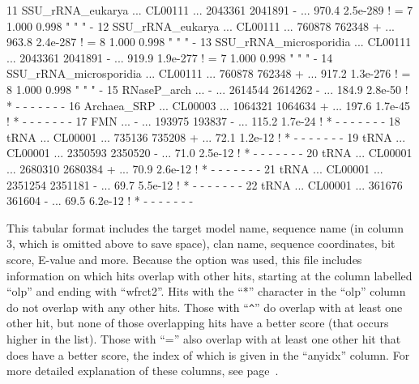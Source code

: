 \begin{tinysreoutput}
11   SSU_rRNA_eukarya       ... CL00111   ... 2043361  2041891      -  ...  970.4  2.5e-289  !   =       7  1.000  0.998      "      "      " -
12   SSU_rRNA_eukarya       ... CL00111   ...  760878   762348      +  ...  963.8  2.4e-287  !   =       8  1.000  0.998      "      "      " -
13   SSU_rRNA_microsporidia ... CL00111   ... 2043361  2041891      -  ...  919.9  1.9e-277  !   =       7  1.000  0.998      "      "      " -
14   SSU_rRNA_microsporidia ... CL00111   ...  760878   762348      +  ...  917.2  1.3e-276  !   =       8  1.000  0.998      "      "      " -
15   RNaseP_arch            ... -         ... 2614544  2614262      -  ...  184.9   2.8e-50  !   *       -      -      -      -      -      - -
16   Archaea_SRP            ... CL00003   ... 1064321  1064634      +  ...  197.6   1.7e-45  !   *       -      -      -      -      -      - -
17   FMN                    ... -         ...  193975   193837      -  ...  115.2   1.7e-24  !   *       -      -      -      -      -      - -
18   tRNA                   ... CL00001   ...  735136   735208      +  ...   72.1   1.2e-12  !   *       -      -      -      -      -      - -
19   tRNA                   ... CL00001   ... 2350593  2350520      -  ...   71.0   2.5e-12  !   *       -      -      -      -      -      - -
20   tRNA                   ... CL00001   ... 2680310  2680384      +  ...   70.9   2.6e-12  !   *       -      -      -      -      -      - -
21   tRNA                   ... CL00001   ... 2351254  2351181      -  ...   69.7   5.5e-12  !   *       -      -      -      -      -      - -
22   tRNA                   ... CL00001   ...  361676   361604      -  ...   69.5   6.2e-12  !   *       -      -      -      -      -      - -
\end{tinysreoutput}

This tabular format includes the target model name, sequence name (in
column 3, which is omitted above to save space), clan name, sequence
coordinates, bit score, E-value and more. Because the 
option was used, this file includes information on which hits overlap
with other hits, starting at the column labelled ``olp'' and ending
with ``wfrct2''. Hits with the ``*'' character in the ``olp'' column
do not overlap with any other hits. Those with ``\verb+^+'' do overlap with
at least one other hit, but none of those overlapping hits have a
better score (that occurs higher in the list). Those with ``='' also
overlap with at least one other hit that does have a better score, the
index of which is given in the ``anyidx'' column. For more detailed
explanation of these columns, see page~\pageref{tabular-format2}.

